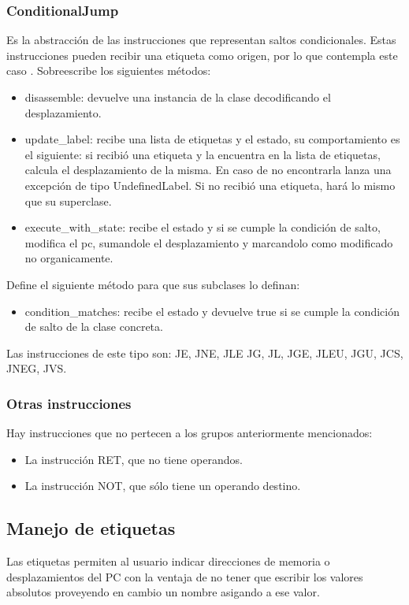 \subsubsection{ConditionalJump}
Es la abstracción de las instrucciones que representan saltos condicionales. Estas instrucciones pueden recibir una etiqueta como origen, por lo que contempla este caso .
Sobreescribe los siguientes métodos:
\begin{itemize}
\item disassemble: devuelve una instancia de la clase decodificando el desplazamiento.
\item update\_label: recibe una lista de etiquetas y el estado, su comportamiento es el siguiente: si recibió una etiqueta y la encuentra en la lista de etiquetas, calcula el desplazamiento de la misma. En caso de no encontrarla lanza una excepción de tipo UndefinedLabel. Si no recibió una etiqueta, hará lo mismo que su superclase.
\item execute\_with\_state: recibe el estado y si se cumple la condición de salto, modifica el pc, sumandole el desplazamiento y marcandolo como modificado no organicamente.
\end{itemize}

Define el siguiente método para que sus subclases lo definan: 
\begin{itemize}
\item condition\_matches: recibe el estado y devuelve true si se cumple la condición de salto de la clase concreta.
\end{itemize}

Las instrucciones de este tipo son: JE, JNE, JLE JG, JL, JGE, JLEU, JGU, JCS, JNEG, JVS.


\subsubsection{Otras instrucciones}
Hay instrucciones que no pertecen a los grupos anteriormente mencionados: 
\begin{itemize}
  \item La instrucción RET, que no tiene operandos.
  \item La instrucción NOT, que sólo tiene un operando destino.
\end{itemize}

\subsection{Manejo de etiquetas}
\label{sec:labels}
Las etiquetas permiten al usuario indicar direcciones de memoria o desplazamientos del PC con la ventaja de no tener que escribir los valores absolutos proveyendo en cambio un nombre asigando a ese valor.

